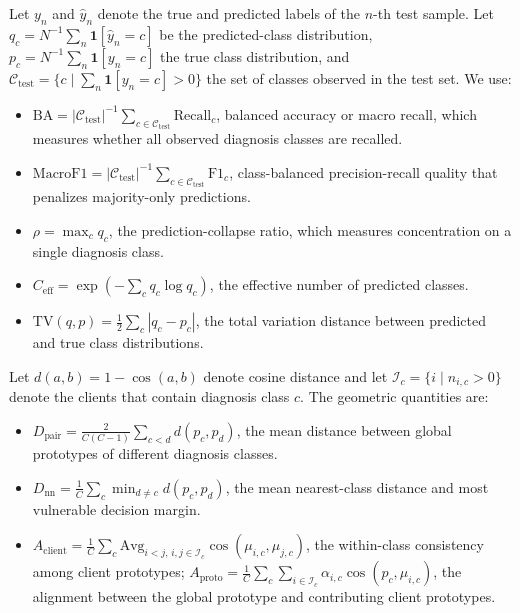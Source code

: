 \documentclass[letterpaper]{article} %
\begin{document}
Let \(y_n\) and \(\hat{y}_n\) denote the true and predicted labels of the \(n\)-th test sample. Let \(q_c=N^{-1}\sum_n\mathbf{1}[\hat{y}_n=c]\) be the predicted-class distribution, \(p_c=N^{-1}\sum_n\mathbf{1}[y_n=c]\) the true class distribution, and \(\mathcal{C}_{\mathrm{test}}=\{c\mid \sum_n\mathbf{1}[y_n=c]>0\}\) the set of classes observed in the test set. We use:
\begin{itemize}
\setlength{\itemsep}{0pt}
\item \(\mathrm{BA}=|\mathcal{C}_{\mathrm{test}}|^{-1}\sum_{c\in\mathcal{C}_{\mathrm{test}}}\mathrm{Recall}_c\), balanced accuracy or macro recall, which measures whether all observed diagnosis classes are recalled.
\item \(\mathrm{MacroF1}=|\mathcal{C}_{\mathrm{test}}|^{-1}\sum_{c\in\mathcal{C}_{\mathrm{test}}}\mathrm{F1}_c\), class-balanced precision-recall quality that penalizes majority-only predictions.
\item \(\rho=\max_c q_c\), the prediction-collapse ratio, which measures concentration on a single diagnosis class.
\item \(C_{\mathrm{eff}}=\exp\left(-\sum_c q_c\log q_c\right)\), the effective number of predicted classes.
\item \(\mathrm{TV}(q,p)=\frac{1}{2}\sum_c |q_c-p_c|\), the total variation distance between predicted and true class distributions.
\end{itemize}

Let \(d(a,b)=1-\cos(a,b)\) denote cosine distance and let \(\mathcal{I}_c=\{i\mid n_{i,c}>0\}\) denote the clients that contain diagnosis class \(c\). The geometric quantities are:
\begin{itemize}
\setlength{\itemsep}{0pt}
\item \(D_{\mathrm{pair}}=\frac{2}{C(C-1)}\sum_{c<d}d(p_c,p_d)\), the mean distance between global prototypes of different diagnosis classes.
\item \(D_{\mathrm{nn}}=\frac{1}{C}\sum_c \min_{d\ne c} d(p_c,p_d)\), the mean nearest-class distance and most vulnerable decision margin.
\item \(A_{\mathrm{client}}=\frac{1}{C}\sum_c \mathrm{Avg}_{i<j,\,i,j\in\mathcal{I}_c}\cos(\mu_{i,c},\mu_{j,c})\), the within-class consistency among client prototypes; \(A_{\mathrm{proto}}=\frac{1}{C}\sum_c\sum_{i\in\mathcal{I}_c}\alpha_{i,c}\cos(p_c,\mu_{i,c})\), the alignment between the global prototype and contributing client prototypes.
\end{itemize}
\end{document}
